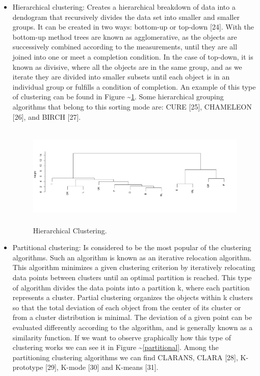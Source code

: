 \documentclass[
]{article}
\begin{document}
\begin{itemize}
\item
  Hierarchical clustering: Creates a hierarchical breakdown of data into
  a dendogram that recursively divides the data set into smaller and
  smaller groups. It can be created in two ways: bottom-up or top-down
  {[}24{]}. With the bottom-up method trees are known as agglomerative,
  as the objects are successively combined according to the
  measurements, until they are all joined into one or meet a completion
  condition. In the case of top-down, it is known as divisive, where all
  the objects are in the same group, and as we iterate they are divided
  into smaller subsets until each object is in an individual group or
  fulfills a condition of completion. An example of this type of
  clustering can be found in Figure \textasciitilde{}\ref{hierarchical}.
  Some hierarchical grouping algorithms that belong to this sorting mode
  are: CURE {[}25{]}, CHAMELEON {[}26{]}, and BIRCH {[}27{]}.\\
  \newpage

  \begin{figure}
  \centering
  \includegraphics[width=\textwidth,height=1.92708in]{img/hierarchical.pdf}
  \caption{Hierarchical Clustering. \label{hierarchical}}
  \end{figure}
\item
  Partitional clustering: Is considered to be the most popular of the
  clustering algorithms. Such an algorithm is known as an iterative
  relocation algorithm. This algorithm minimizes a given clustering
  criterion by iteratively relocating data points between clusters until
  an optimal partition is reached. This type of algorithm divides the
  data points into a partition k, where each partition represents a
  cluster. Partial clustering organizes the objects within k clusters so
  that the total deviation of each object from the center of its cluster
  or from a cluster distribution is minimal. The deviation of a given
  point can be evaluated differently according to the algorithm, and is
  generally known as a similarity function. If we want to observe
  graphically how this type of clustering works we can see it in Figure
  \textasciitilde{}\ref{partitional}. Among the partitioning clustering
  algorithms we can find CLARANS, CLARA {[}28{]}, K-prototype {[}29{]},
  K-mode {[}30{]} and K-means {[}31{]}.


\end{itemize}
\end{document}

